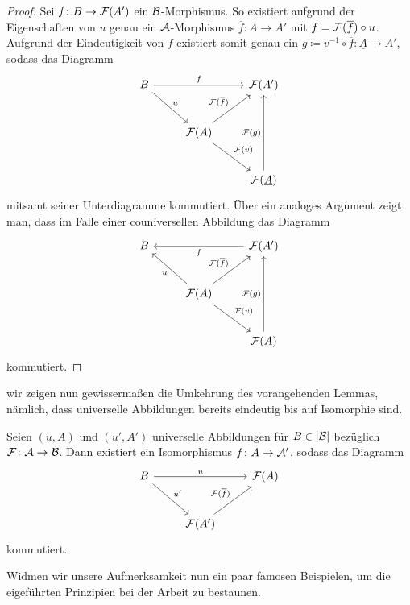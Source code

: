 \begin{proof}
  Sei $f \colon B \to \mathcal{F}(A')$ ein $\mathcal{B}$-Morphismus. 
  So existiert aufgrund der Eigenschaften von $u$ genau ein $\mathcal{A}$-Morphismus $\overline f \colon A \to A'$ mit $f = \mathcal{F}(\overline f) \circ u$.
  Aufgrund der Eindeutigkeit von $f$ existiert somit genau ein $g \coloneqq v^{-1} \circ \overline f \colon \underline A \to A'$, sodass das Diagramm   
  $$
  \begin{tikzcd}[row sep=2.5em]
    B \arrow[rd,"u"] \arrow[rr, "f"] &&\F(A') \\
    &\F(A) \arrow[ru, "\F(\overline{f})"] \arrow[rd,"\F(v)"] \\
    &&\F(\underline A) \arrow[uu,"\F(g)"]
  \end{tikzcd}
  $$
  mitsamt seiner Unterdiagramme kommutiert.
  Über ein analoges Argument zeigt man, dass im Falle einer couniversellen Abbildung das Diagramm
  $$
  \begin{tikzcd}[row sep=2.5em]
    B  & & \F(A') \arrow[ll, "f"]  \\
    & \F(A)\arrow[ru, "\F(\overline{f})"] \arrow[lu,"u"] \arrow[rd, "\F(v)"]  & \\
    & & \F(\underline A) \arrow[uu, "\F(g)"]
  \end{tikzcd}
  $$
  kommutiert.
\end{proof}

wir zeigen nun gewissermaßen die Umkehrung des vorangehenden Lemmas, nämlich, dass universelle Abbildungen bereits eindeutig bis auf Isomorphie sind.

\begin{prop}
  Seien $(u,A)$ und $(u',A')$ universelle Abbildungen für $B \in |\mathcal{B}|$ bezüglich $\mathcal{F} \colon \mathcal{A} \to \mathcal{B}$.
  Dann existiert ein Isomorphismus $f \colon A \to \mathcal{A}'$, sodass das Diagramm
  $$
  \begin{tikzcd}[row sep=2.5em]
    B \arrow[rd,"u'"] \arrow[rr, "u"] &&\F(A) \\
    &\F(A') \arrow[ru, "\F(\overline{f})"]
  \end{tikzcd}
  $$
  kommutiert.
\end{prop}

Widmen wir unsere Aufmerksamkeit nun ein paar famosen Beispielen, um die eigeführten Prinzipien bei der Arbeit zu bestaunen.

